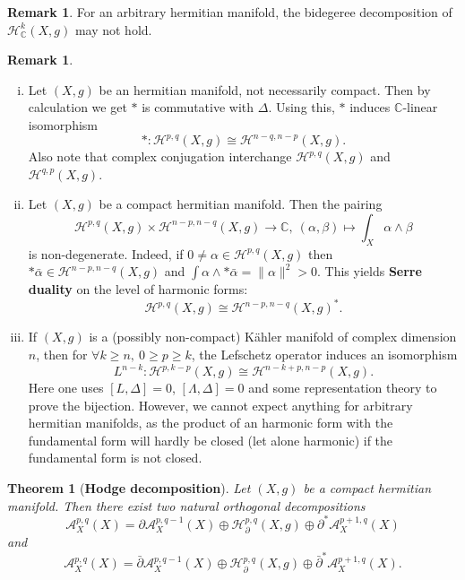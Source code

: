 \documentclass{article}
\theoremstyle{definition}
\newtheorem{remark}[definition]{Remark}
\theoremstyle{plain}
\newtheorem{theorem}[definition]{Theorem}
\begin{document}
\begin{remark}
    For an arbitrary hermitian manifold, the bidegeree decomposition of $ \mathcal{H}^{k}_{\mathbb{C}}(X,g) $ may not hold.
\end{remark}

\begin{remark}\label{sd}
    \begin{enumerate}[(i)]
        \item Let $ (X,g) $ be an hermitian manifold, not necessarily compact. Then by calculation we get $ * $ is commutative with $ \varDelta $. Using this, $ * $ induces $ \mathbb{C} $-linear isomorphism\[
            *:\mathcal{H}^{p,q}(X,g)\cong\mathcal{H}^{n-q,n-p}(X,g).
        \]Also note that complex conjugation interchange $ \mathcal{H}^{p,q}(X,g) $ and $ \mathcal{H}^{q,p}(X,g) $.
        \item Let $ (X,g) $ be a compact hermitian manifold. Then the pairing\[
            \mathcal{H}^{p,q}(X,g)\times\mathcal{H}^{n-p,n-q}(X,g)\longrightarrow \mathbb{C},\ (\alpha,\beta)\longmapsto\int\nolimits_{X}\alpha\wedge\beta
        \]is non-degenerate. Indeed, if $ 0\neq\alpha\in\mathcal{H}^{p,q}(X,g) $ then $ *\bar{\alpha}\in\mathcal{H}^{n-p,n-q}(X,g) $ and $ \int\alpha\wedge*\bar{\alpha}=\|\alpha\|^2>0 $. This yields \textbf{Serre duality} on the level of harmonic forms:\[
            \mathcal{H}^{p,q}(X,g)\cong\mathcal{H}^{n-p,n-q}(X,g)^*.
        \]
        \item If $ (X,g) $ is a (possibly non-compact) K\"{a}hler manifold of complex dimension $ n $, then for $ \forall k\geqslant n,\ 0\geqslant p\geqslant k $, the Lefschetz operator induces an isomorphism\[
            L^{n-k}:\mathcal{H}^{p,k-p}(X,g)\cong\mathcal{H}^{n-k+p,n-p}(X,g).
        \]Here one uses $ [L,\varDelta]=0 $, $ [\varLambda,\varDelta]=0 $ and some representation theory to prove the bijection. However, we cannot expect anything for arbitrary hermitian manifolds, as the product of an harmonic form with the fundamental form will hardly be closed (let alone harmonic) if the fundamental form is not closed.
    \end{enumerate}
\end{remark}

\begin{theorem}[\textbf{Hodge decomposition}]
    Let $ (X,g) $ be a compact hermitian manifold. Then there exist two natural orthogonal decompositions\[
        \mathcal{A}^{p,q}_{X}(X)=\partial\mathcal{A}^{p,q-1}_{X}(X)\oplus\mathcal{H}^{p,q}_{\partial}(X,g)\oplus\partial^*\mathcal{A}^{p+1,q}_{X}(X)
    \]and\[
        \mathcal{A}^{p,q}_{X}(X)=\bar{\partial}\mathcal{A}^{p,q-1}_{X}(X)\oplus\mathcal{H}^{p,q}_{\partial}(X,g)\oplus\bar{\partial}^*\mathcal{A}^{p+1,q}_{X}(X).
    \]
\end{theorem}
\end{document}
